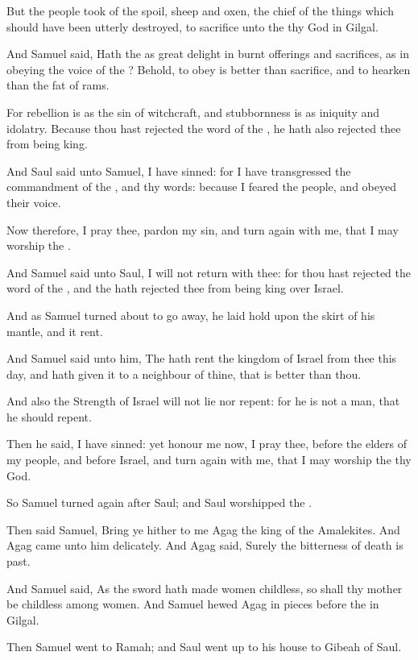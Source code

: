 \verse But the people took of the spoil, sheep and oxen, the chief of the things which should have been utterly destroyed, to sacrifice unto the \LORD thy God in Gilgal.

\verse And Samuel said, Hath the \LORD as great delight in burnt offerings and sacrifices, as in obeying the voice of the \LORD? Behold, to obey is better than sacrifice, and to hearken than the fat of rams.

\verse For rebellion is as the sin of witchcraft, and stubbornness is as iniquity and idolatry. Because thou hast rejected the word of the \LORD, he hath also rejected thee from being king.

\verse And Saul said unto Samuel, I have sinned: for I have transgressed the commandment of the \LORD, and thy words: because I feared the people, and obeyed their voice.

\verse Now therefore, I pray thee, pardon my sin, and turn again with me, that I may worship the \LORD.

\verse And Samuel said unto Saul, I will not return with thee: for thou hast rejected the word of the \LORD, and the \LORD hath rejected thee from being king over Israel.

\verse And as Samuel turned about to go away, he laid hold upon the skirt of his mantle, and it rent.

\verse And Samuel said unto him, The \LORD hath rent the kingdom of Israel from thee this day, and hath given it to a neighbour of thine, that is better than thou.

\verse And also the Strength of Israel will not lie nor repent: for he is not a man, that he should repent.

\verse Then he said, I have sinned: yet honour me now, I pray thee, before the elders of my people, and before Israel, and turn again with me, that I may worship the \LORD thy God.

\verse So Samuel turned again after Saul; and Saul worshipped the \LORD.

\verse Then said Samuel, Bring ye hither to me Agag the king of the Amalekites. And Agag came unto him delicately. And Agag said, Surely the bitterness of death is past.

\verse And Samuel said, As the sword hath made women childless, so shall thy mother be childless among women. And Samuel hewed Agag in pieces before the \LORD in Gilgal.

\verse Then Samuel went to Ramah; and Saul went up to his house to Gibeah of Saul.


